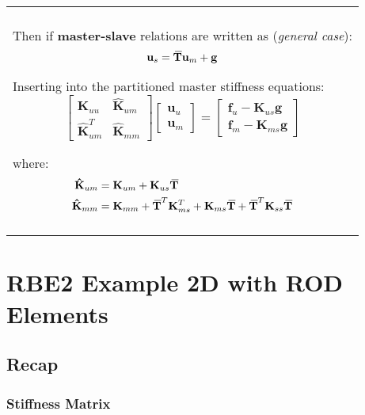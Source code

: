\documentclass[10pt,b5paper,titlepage]{book}
\newcommand{\m}{\mathbf}
\newcommand{\closure}[2][3]{%
{}\mkern#1mu\overline{\mkern-#1mu#2}}
\newenvironment{bbox}[1][0.96]
{
    \begin{center}
        \begin{tabular}{|p{#1\textwidth}|}
            \hline\\
}
{
            \\\\\hline
        \end{tabular}
    \end{center}
}
\newenvironment{eqarray}
{
    \begin{eqnarray}
        \begin{aligned}
}
{
        \end{aligned}
    \end{eqnarray}
}
\begin{document}
\begin{bbox}

    Then if \textbf{master-slave} relations are written as (\textit{general case}):
    \begin{equation}
        \m{u}_s = \m{\closure{T}} \m{u}_m + \m{g}
    \end{equation}

    Inserting into the partitioned master stiffness equations:
    \begin{equation}
        \begin{bmatrix}
            \m{K}_{uu} & \m{\hat{K}}_{um} \\
            \m{\hat{K}}_{um}^T & \m{\hat{K}}_{mm}
        \end{bmatrix}
        \begin{bmatrix}
            \m{u}_u \\
            \m{u}_m
        \end{bmatrix}
        = \begin{bmatrix}
            \m{f}_u - \m{K}_{us} \m{g} \\
            \m{f}_m - \m{K}_{ms} \m{g}
        \end{bmatrix}
    \end{equation}

    where:
    \begin{eqarray}
        \m{\hat{K}}_{um} &= \m{K}_{um} + \m{K}_{us} \m{\closure{T}} \\
        \m{\hat{K}}_{mm} &= \m{K}_{mm} + \m{\closure{T}}^T \m{K}_{ms}^T
                            + \m{K}_{ms} \m{\closure{T}}
                            + \m{\closure{T}}^T \m{K}_{ss} \m{\closure{T}}
    \end{eqarray}

\end{bbox}


\newpage
\section{RBE2 Example 2D with ROD Elements}

\subsection{Recap}

\subsubsection{Stiffness Matrix}
\end{document}
